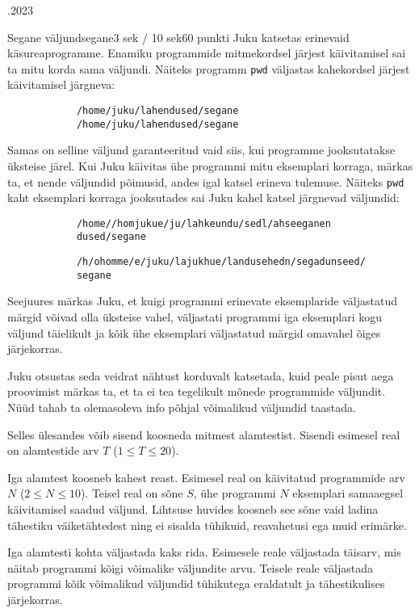 \documentclass[a4paper,11pt]{article}
\begin{document}
\begin{ol}{\eio}{.2023}{\yle}{}
	\begin{yl}{6}{Segane väljund}{segane}{3 sek / 10 sek}{60 punkti}
		Juku katsetas erinevaid käsureaprogramme. Enamiku programmide mitmekordsel järjest käivitamisel sai ta mitu korda sama väljundi. Näiteks programm \verb|pwd| väljastas kahekordsel järjest käivitamisel järgneva:
		\begin{verbatim}
			/home/juku/lahendused/segane
			/home/juku/lahendused/segane
		\end{verbatim}

		Samas on selline väljund garanteeritud vaid siis, kui programme jooksutatakse üksteise järel. Kui Juku käivitas ühe programmi mitu eksemplari korraga, märkas ta, et nende väljundid põimusid, andes igal katsel erineva tulemuse. Näiteks \verb|pwd| kaht eksemplari korraga jooksutades sai Juku kahel katsel järgnevad väljundid:
		\begin{verbatim}
			/home//homjukue/ju/lahkeundu/sedl/ahseeganen
			dused/segane
		\end{verbatim}
		\vspace{-3mm}
		\begin{verbatim}
			/h/ohomme/e/juku/lajukhue/landusehedn/segadunseed/
			segane
		\end{verbatim}
		Seejuures märkas Juku, et kuigi programmi erinevate eksemplaride väljastatud märgid võivad olla üksteise vahel, väljastati programmi iga eksemplari kogu väljund täielikult ja kõik ühe eksemplari väljastatud märgid omavahel õiges järjekorras.

		Juku otsustas seda veidrat nähtust korduvalt katsetada, kuid peale pisut aega proovimist märkas ta, et ta ei tea tegelikult mõnede programmide väljundit. Nüüd tahab ta olemasoleva info põhjal võimalikud väljundid taastada.

		\sis Selles ülesandes võib sisend koosneda mitmest alamtestist. Sisendi esimesel real on alamtestide arv $T$ ($1 \le T \le 20$).

		Iga alamtest koosneb kahest reast.
		Esimesel real on käivitatud programmide arv $N$ ($2 \le N \le 10$).
		Teisel real on sõne $S$, ühe programmi $N$ eksemplari samaaegsel käivitamisel saadud väljund. Lihtsuse huvides koosneb see sõne vaid ladina tähestiku väiketähtedest ning ei sisalda tühikuid, rea\-vahetusi ega muid erimärke.

		\val Iga alamtesti kohta väljastada kaks rida.
		Esimesele reale väljastada täisarv, mis näitab programmi kõigi võimalike väljundite arvu.
		Teisele reale väljastada programmi kõik võimalikud väljundid tühikutega eraldatult ja tähestikulises järjekorras.


\end{yl}
\end{ol}
\end{document}
